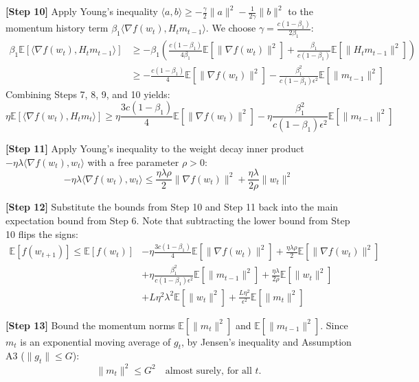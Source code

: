 \documentclass[11pt]{article}
\begin{document}
\textbf{[Step 10]} Apply Young's inequality $\langle a, b \rangle \geq -\frac{\gamma}{2}\|a\|^2 - \frac{1}{2\gamma}\|b\|^2$ to the momentum history term $\beta_1 \langle \nabla f(w_t), H_t m_{t-1} \rangle$. We choose $\gamma = \frac{c(1-\beta_1)}{2\beta_1}$:
\begin{align}
    \beta_1 \mathbb{E}[\langle \nabla f(w_t), H_t m_{t-1} \rangle] &\geq -\beta_1 \left( \frac{c(1-\beta_1)}{4\beta_1} \mathbb{E}[\|\nabla f(w_t)\|^2] + \frac{\beta_1}{c(1-\beta_1)} \mathbb{E}[\|H_t m_{t-1}\|^2] \right) \nonumber \\
    &\geq -\frac{c(1-\beta_1)}{4} \mathbb{E}[\|\nabla f(w_t)\|^2] - \frac{\beta_1^2}{c(1-\beta_1)\epsilon^2} \mathbb{E}[\|m_{t-1}\|^2]
\end{align}
Combining Steps 7, 8, 9, and 10 yields:
\begin{equation}
    \eta \mathbb{E}[\langle \nabla f(w_t), H_t m_t \rangle] \geq \eta \frac{3c(1-\beta_1)}{4} \mathbb{E}[\|\nabla f(w_t)\|^2] - \eta \frac{\beta_1^2}{c(1-\beta_1)\epsilon^2} \mathbb{E}[\|m_{t-1}\|^2]
\end{equation}

\textbf{[Step 11]} Apply Young's inequality to the weight decay inner product $-\eta \lambda \langle \nabla f(w_t), w_t \rangle$ with a free parameter $\rho > 0$:
\begin{equation}
    -\eta \lambda \langle \nabla f(w_t), w_t \rangle \leq \frac{\eta \lambda \rho}{2} \|\nabla f(w_t)\|^2 + \frac{\eta \lambda}{2\rho} \|w_t\|^2
\end{equation}

\textbf{[Step 12]} Substitute the bounds from Step 10 and Step 11 back into the main expectation bound from Step 6. Note that subtracting the lower bound from Step 10 flips the signs:
\begin{align}
    \mathbb{E}[f(w_{t+1})] \leq \mathbb{E}[f(w_t)] &- \eta \frac{3c(1-\beta_1)}{4} \mathbb{E}[\|\nabla f(w_t)\|^2] + \frac{\eta \lambda \rho}{2} \mathbb{E}[\|\nabla f(w_t)\|^2] \nonumber \\
    &+ \eta \frac{\beta_1^2}{c(1-\beta_1)\epsilon^2} \mathbb{E}[\|m_{t-1}\|^2] + \frac{\eta \lambda}{2\rho} \mathbb{E}[\|w_t\|^2] \nonumber \\
    &+ L \eta^2 \lambda^2 \mathbb{E}[\|w_t\|^2] + \frac{L \eta^2}{\epsilon^2} \mathbb{E}[\|m_t\|^2]
\end{align}

\textbf{[Step 13]} Bound the momentum norms $\mathbb{E}[\|m_t\|^2]$ and $\mathbb{E}[\|m_{t-1}\|^2]$. Since $m_t$ is an exponential moving average of $g_t$, by Jensen's inequality and Assumption A3 ($\|g_t\| \leq G$):
\begin{equation}
    \|m_t\|^2 \leq G^2 \quad \text{almost surely, for all } t.
\end{equation}
\end{document}
